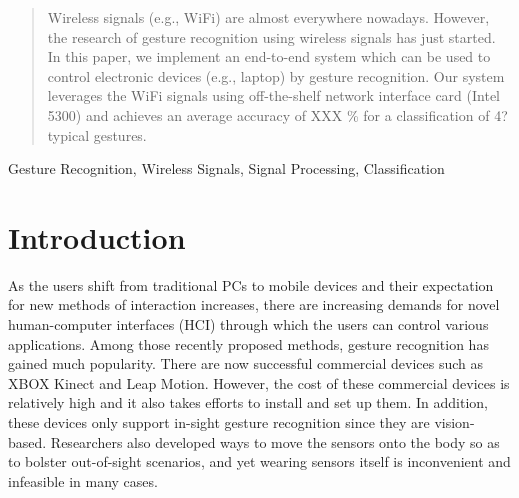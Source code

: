 \documentclass[conference]{IEEEtran}
\begin{document}




\maketitle


\begin{abstract}
Wireless signals (e.g., WiFi) are almost everywhere nowadays. However, the research of gesture recognition using wireless signals has just started. In this paper, we implement an end-to-end system which can be used to control electronic devices (e.g., laptop) by gesture recognition. Our system leverages the WiFi signals using off-the-shelf network interface card (Intel 5300) and achieves an average accuracy of XXX \% for a classification of 4? typical gestures.   

\end{abstract}


\begin{keywords}
Gesture Recognition, Wireless Signals, Signal Processing, Classification
\end{keywords}


%
\IEEEpeerreviewmaketitle

\section{Introduction}
As the users shift from traditional PCs to mobile devices and their expectation for new methods of interaction increases, there are increasing demands for novel human-computer interfaces (HCI) through which the users can control various applications.
Among those recently proposed methods, gesture recognition has gained much popularity. There are now successful commercial devices such as XBOX Kinect and Leap Motion. 
However, the cost of these commercial devices is relatively high and it also takes efforts to install and set up them.
In addition, these devices only support in-sight gesture recognition since they are vision-based.
Researchers also developed ways to move the sensors onto the body so as to bolster out-of-sight scenarios, and yet wearing sensors itself is inconvenient and infeasible in many cases.
\end{document}
